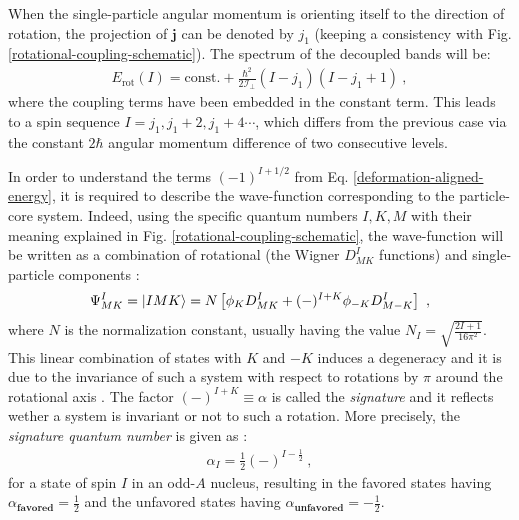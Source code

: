 When the single-particle angular momentum is orienting itself to the direction of rotation, the projection of $\mathbf{j}$ can be denoted by $j_1$ (keeping a consistency with Fig. \ref{rotational-coupling-schematic}). The spectrum of the decoupled bands will be:
\begin{align}
    E_\text{rot}(I)=\text{const.}+\frac{\hbar^2}{2\mathcal{I}_\perp}(I-j_1)(I-j_1+1)\ ,
\end{align}
where the coupling terms have been embedded in the constant term. This leads to a spin sequence $I=j_1,j_1+2,j_1+4\cdots$, which differs from the previous case via the constant $2\hbar$ angular momentum difference of two consecutive levels.

In order to understand the terms $(-1)^{I+1/2}$ from Eq. \ref{deformation-aligned-energy}, it is required to describe the wave-function corresponding to the particle-core system. Indeed, using the specific quantum numbers $I,K,M$ with their meaning explained in Fig. \ref{rotational-coupling-schematic}, the wave-function will be written as a combination of rotational (the Wigner $D_{MK}^I$ functions) and single-particle components \cite{wang2007exotic,davydov1958rotational}:
\begin{align}
    \Psi_{MK}^I=\ket{IMK}=N\left[\phi_K D_{MK}^I+(-)^{I+K}\phi_{-K}D_{M-K}^I\right]\ ,
    \label{RAL-bands-wave-function}
\end{align}
where $N$ is the normalization constant, usually having the value $N_I=\sqrt{\frac{2I+1}{16\pi^2}}$. This linear combination of states with $K$ and $-K$ induces a degeneracy and it is due to the invariance of such a system with respect to rotations by $\pi$ around the rotational axis \cite{frauendorf1997tilted,bohr1998nuclear}. The factor $(-)^{I+K}\equiv\alpha$ is called the \emph{signature} and it reflects wether a system is invariant or not to such a rotation. More precisely, the \emph{signature quantum number} is given as \cite{sun1994varied}:
\begin{align}
    \alpha_I=\frac{1}{2}(-)^{I-\frac{1}{2}}\ ,
\end{align}
for a state of spin $I$ in an odd-$A$ nucleus, resulting in the favored states having $\alpha_\textbf{favored}=\frac{1}{2}$ and the unfavored states having $\alpha_\textbf{unfavored}=-\frac{1}{2}$.

